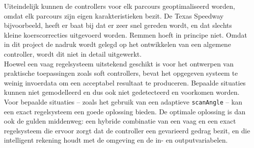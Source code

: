 \documentclass[10pt,a4paper]{article}
\begin{document}
			Uiteindelijk kunnen de controllers voor elk parcours geoptimaliseerd worden, omdat elk parcours zijn eigen karakteristieken bezit. De Texas Speedway bijvoorbeeld, heeft er baat bij dat er zeer snel gereden wordt, en dat slechts kleine koerscorrecties uitgevoerd worden. Remmen hoeft in principe niet. Omdat in dit project de nadruk wordt gelegd op het ontwikkelen van een algemene controller, wordt dit niet in detail uitgewerkt.\\

			Hoewel een vaag regelsysteem uitstekend geschikt is voor het ontwerpen van praktische toepassingen zoals soft controllers, bevat het opgegeven systeem te weinig invoerdata om een acceptabel resultaat te produceren. Bepaalde situaties kunnen niet gemodelleerd en dus ook niet gedetecteerd en voorkomen worden. Voor bepaalde situaties -- zoals het gebruik van een adaptieve \texttt{scanAngle} -- kan een exact regelsysteem een goede oplossing bieden. De optimale oplossing is dan ook de gulden middenweg: een hybride combinatie van een vaag en een exact regelsysteem die ervoor zorgt dat de controller een gevarieerd gedrag bezit, en die intelligent rekening houdt met de omgeving en de in- en outputvariabelen.
\end{document}

